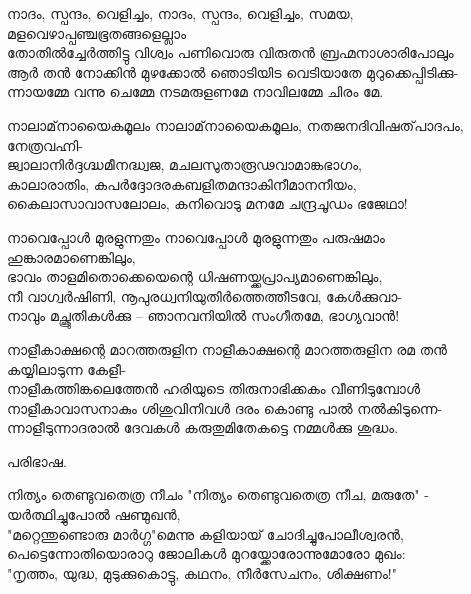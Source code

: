 \begin{enumerate}




\begin{slokam}{\VSr}{\RV}{നാദം, സ്പന്ദം, വെളിച്ചം,}
നാദം, സ്പന്ദം, വെളിച്ചം, സമയ, മളവെഴാപ്പഞ്ചഭൂതങ്ങളെല്ലാം\\
തോതിൽച്ചേർത്തിട്ടു വിശ്വം പണിവൊരു വിരുതൻ ബ്രഹ്മനാശാരിപോലും\\
ആർ തൻ നോക്കിൻ മുഴക്കോൽ ഞൊടിയിട വെടിയാതേ മുറുക്കെപ്പിടിക്കു-\\
ന്നായമ്മേ വന്നു ചെമ്മേ നടമരുളണമേ നാവിലമ്മേ ചിരം മേ.
\end{slokam}



\begin{slokam}{\VSr}{\Unk}{നാലാമ്‌നായൈകമൂലം}
നാലാമ്‌നായൈകമൂലം, നതജനദിവിഷത്‌പാദപം, നേത്രവഹ്നി-\\
ജ്വാലാനിർദ്ദഗ്ദ്ധമീനദ്ധ്വജ, മചലസുതാരൂഢവാമാങ്കഭാഗം,\\
കാലാരാതിം, കപർദ്ദോദരകബളിതമന്ദാകിനീമാനനീയം,\\
കൈലാസാവാസലോലം, കനിവൊടു മനമേ ചന്ദ്രചൂഡം ഭജേഥാ!
\end{slokam}



\begin{slokam}{\VSv}{\UN}{നാവെപ്പോള്‍ മുരളുന്നതും}
നാവെപ്പോള്‍ മുരളുന്നതും പരുഷമാം ഹുങ്കാരമാണെങ്കിലും,\\
ഭാവം താളമിതൊക്കെയെന്റെ ധിഷണയ്ക്കപ്രാപ്യമാണെങ്കിലും,\\
നീ വാഗ്വർഷിണി, നൂപുരധ്വനിയുതിർത്തെത്തീടവേ, കേള്‍ക്കുവാ-\\
നാവും മച്ഛ്രുതികള്‍ക്കു – ഞാനവനിയിൽ  സംഗീതമേ, ഭാഗ്യവാൻ!
\end{slokam}



\begin{slokam}{\VSr}{\KKT}{നാളീകാക്ഷന്റെ മാറത്തരുളിന}
നാളീകാക്ഷന്റെ മാറത്തരുളിന രമ തൻ കയ്യിലാടുന്ന കേളീ-\\
നാളീകത്തിങ്കലെത്തേൻ ഹരിയുടെ തിരുനാഭിക്കകം വീണിടുമ്പോള്‍\\
നാളീകാവാസനാകും ശിശുവിനിവള്‍ ദരം കൊണ്ടു പാൽ നൽകിടുന്നെ-\\
ന്നാളീടുന്നാദരാൽ ദേവകള്‍ കരുതുമിതേകട്ടെ നമ്മള്‍ക്കു ശുദ്ധം.
\end{slokam}


പരിഭാഷ.  


\begin{slokam}{\VSv}{\Balendu}{നിത്യം തെണ്ടുവതെത്ര നീചം}
"നിത്യം തെണ്ടുവതെത്ര നീച, മരുതേ" - യര്‍ത്ഥിച്ചുപോല്‍ ഷണ്മുഖന്‍,\\
"മറ്റെന്തുണ്ടൊരു മാര്‍ഗ്ഗ"മെന്നു കളിയായ്‌ ചോദിച്ചുപോലീശ്വരന്‍,\\
പെട്ടെന്നോതിയൊരാറു ജോലികള്‍ മുറയ്ക്കോരോന്നുമോരോ മുഖം:\\
"നൃത്തം, യുദ്ധ, മുടുക്കുകൊട്ടു, കഥനം, നീര്‍സേചനം, ശിക്ഷണം!"
\end{slokam}


\end{enumerate}
